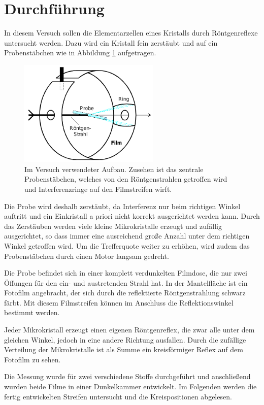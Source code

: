 \section{Durchführung}
In diesem Versuch sollen die Elementarzellen eines Kristalls durch Röntgenreflexe untersucht werden. Dazu wird ein Kristall fein zerstäubt und auf ein Probenstäbchen wie in Abbildung \ref{pic:aufbau} aufgetragen.
\begin{figure}[htbp]
	\includegraphics[width=0.6\textwidth]{../pics/aufbau.png}
	\caption{Im Versuch verwendeter Aufbau. Zusehen ist das zentrale Probenstäbchen, welches von den Röntgenstrahlen getroffen wird und Interferenzringe auf den Filmstreifen wirft.}
	\label{pic:aufbau}
\end{figure}
Die Probe wird deshalb zerstäubt, da Interferenz nur beim richtigen Winkel auftritt und ein Einkristall a priori nicht korrekt ausgerichtet werden kann. Durch das Zerstäuben werden viele kleine Mikrokristalle erzeugt und zufällig ausgerichtet, so dass immer eine ausreichend große Anzahl unter dem richtigen Winkel getroffen wird. Um die Trefferquote weiter zu erhöhen, wird zudem das Probenstäbchen durch einen Motor langsam gedreht. 

Die Probe befindet sich in einer komplett verdunkelten Filmdose, die nur zwei Öffungen für den ein- und austretenden Strahl hat. In der Mantelfläche ist ein Fotofilm angebracht, der sich durch die reflektierte Röntgenstrahlung schwarz färbt. Mit diesem Filmstreifen können im Anschluss die Reflektionswinkel bestimmt werden.

Jeder Mikrokristall erzeugt einen eigenen Röntgenreflex, die zwar alle unter dem gleichen Winkel, jedoch in eine andere Richtung ausfallen. Durch die zufällige Verteilung der Mikrokristalle ist als Summe ein kreisförmiger Reflex auf dem Fotofilm zu sehen.

Die Messung wurde für zwei verschiedene Stoffe durchgeführt und anschließend wurden beide Filme in einer Dunkelkammer entwickelt. Im Folgenden werden die fertig entwickelten Streifen untersucht und die Kreispositionen abgelesen.  

